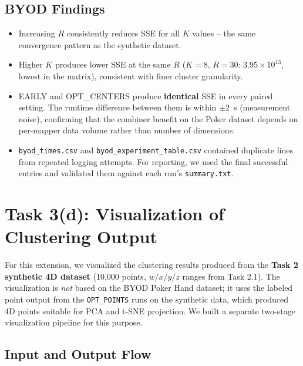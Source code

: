 \documentclass[11pt]{article}
\begin{document}
\subsection{BYOD Findings}

\begin{itemize}[noitemsep,topsep=2pt]
  \item Increasing $R$ consistently reduces SSE for all $K$ values -- the same convergence pattern as the synthetic dataset.
  \item Higher $K$ produces lower SSE at the same $R$ ($K{=}8$, $R{=}30$: $3.95\times10^{13}$, lowest in the matrix), consistent with finer cluster granularity.
  \item EARLY and OPT\_CENTERS produce \textbf{identical} SSE in every paired setting. The runtime difference between them is within $\pm2$~s (measurement noise), confirming that the combiner benefit on the Poker dataset depends on per-mapper data volume rather than number of dimensions.
  \item \texttt{byod\_times.csv} and \texttt{byod\_experiment\_table.csv} contained duplicate lines from repeated logging attempts. For reporting, we used the final successful entries and validated them against each run's \texttt{summary.txt}.
\end{itemize}

\section{Task 3(d): Visualization of Clustering Output}

For this extension, we visualized the clustering results produced from the \textbf{Task 2 synthetic 4D dataset} (10,000 points, $w/x/y/z$ ranges from Task 2.1). The visualization is \emph{not} based on the BYOD Poker Hand dataset; it uses the labeled point output from the \texttt{OPT\_POINTS} runs on the synthetic data, which produced 4D points suitable for PCA and t-SNE projection. We built a separate two-stage visualization pipeline for this purpose.

\subsection{Input and Output Flow}
\end{document}
